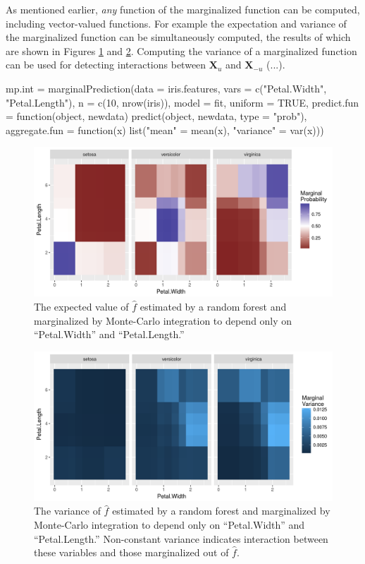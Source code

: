 As mentioned earlier, \textit{any} function of the marginalized function can be computed, including vector-valued functions. For example the expectation and variance of the marginalized function can be simultaneously computed, the results of which are shown in Figures \ref{figure:mp_int_mean} and \ref{figure:mp_int_var}. Computing the variance of a marginalized function can be used for detecting interactions between $\mathbf{X}_u$ and $\mathbf{X}_{-u}$ (...).

\begin{example}
mp.int = marginalPrediction(data = iris.features,
  vars = c("Petal.Width", "Petal.Length"),
  n = c(10, nrow(iris)), model = fit, uniform = TRUE,
  predict.fun = function(object, newdata) predict(object, newdata, type = "prob"),
  aggregate.fun = function(x) list("mean" = mean(x), "variance" = var(x)))
\end{example}

\begin{figure}
  \includegraphics[width=\textwidth]{mp_int_mean.png}
  \caption{The expected value of $\hat{f}$ estimated by a random forest and marginalized by Monte-Carlo integration to depend only on ``Petal.Width'' and ``Petal.Length.'' \label{figure:mp_int_mean}}
\end{figure}

\begin{figure}
  \includegraphics[width=\textwidth]{mp_int_var.png}
  \caption{The variance of $\hat{f}$ estimated by a random forest and marginalized by Monte-Carlo integration to depend only on ``Petal.Width'' and ``Petal.Length.'' Non-constant variance indicates interaction between these variables and those marginalized out of $\hat{f}$. \label{figure:mp_int_var}}
\end{figure}

